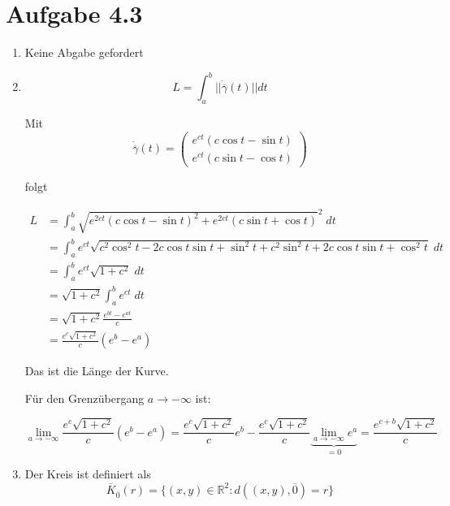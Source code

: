 \documentclass[a4paper,german,12pt,smallheadings]{scrartcl}
\begin{document}
\section*{Aufgabe 4.3}
\begin{enumerate}[(1)]
  \item Keine Abgabe gefordert
  \item
    \begin{equation*}
      L = \int_a^b || \dot{\overline{\gamma}}(t) || dt
    \end{equation*}

    Mit
    \begin{equation*}
      \dot{\overline{\gamma}}(t) = \begin{pmatrix}
        e^{ct} (c \cos t - \sin t) \\
        e^{ct} (c \sin t - \cos t)
      \end{pmatrix}
    \end{equation*}

    folgt

    \begin{align*}
      L &= \int_a^b \sqrt{e^{2ct} (c \cos t - \sin t)^2 + e^{2ct} (c \sin t + \cos t)}^2 \; dt \\
        &= \int_a^b e^{ct} \sqrt{c^2 \cos^2 t - 2c\cos t \sin t + \sin^2 t + c^2 \sin^2t + 2c \cos t \sin t + \cos^2 t} \; dt \\
        &= \int_a^b e^{ct} \sqrt{1+c^2} \; dt \\
        &= \sqrt{1+c^2} \int_a^b e^{ct} \; dt \\
        &= \sqrt{1+c^2} \frac{e^{bt} - e^{at}}{c} \\
        &= \frac{e^c \sqrt{1+c^2}}{c} (e^b - e^a)
    \end{align*}

    Das ist die Länge der Kurve.

    Für den Grenzübergang $a \to -\infty$ ist:

    \begin{equation*}
      \lim_{a \to -\infty} \frac{e^c\sqrt{1+c^2}}{c} (e^b - e^a) = \frac{e^c\sqrt{1+c^2}}{c} e^b - \frac{e^c\sqrt{1+c^2}}{c} \underbrace{\lim_{a \to -\infty} e^a}_{=0} = \frac{e^{c+b} \sqrt{1+c^2}}{c}
    \end{equation*}

  \item
    Der Kreis ist definiert als
    \begin{equation*}
      \overline{K}_{\overline{0}}(r) = \{(x,y) \in \mathbb{R}^2: d((x,y), \overline{0}) = r \}
    \end{equation*}


\end{enumerate}
\end{document}
